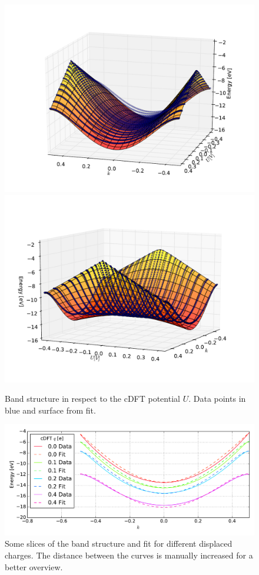 \begin{figure}[!p]
	\centering
	\includegraphics[width = 13cm]{Images/Hydrogen/charging/3D/figure_1-2}
	\includegraphics[width = 13cm]{Images/Hydrogen/charging/3D/figure_1-1}
	\caption{Band structure in respect to the cDFT potential $U$. Data points in blue and surface from fit.}
	\label{image_hydrogen_3D_2}
\end{figure}
\begin{figure}
	\centering
	\includegraphics[width = 13cm]{Images/Hydrogen/charging/3D_cuts}
	\caption{Some slices of the band structure and fit for different displaced charges. The distance between the curves is manually increased for a better overview.}
	\label{image_hydrogen_3D_slices}
\end{figure}
